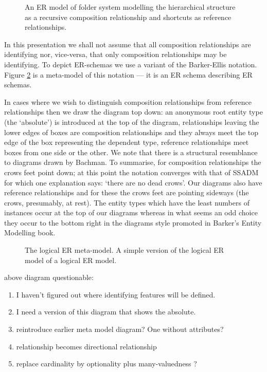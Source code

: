 \begin{figure}[H]
\begin{center}

\end{center}
\caption{An ER model of folder system modelling the hierarchical structure as a recursive composition relationship and shortcuts as reference relationships.}
\label{filesystem2FirstInstance}
\end{figure}

In this presentation we shall not assume that all composition relationships are identifying nor, vice-versa, that only composition relationships may be identifying. To depict ER-schemas we use a variant of the Barker-Ellis notation. 
Figure \ref{entityRelationalMetaModel1} is a meta-model of this notation — it is an ER schema describing ER schemas.

In cases where we wish to distinguish composition relationships from reference relationships then we draw the diagram top down: an anonymous root entity type (the ‘absolute’) is introduced at the top of the diagram, relationships leaving the lower edges of boxes are composition relationships and they always meet the top edge of the box representing the dependent type, reference relationships meet boxes from one side or the other. We note that there is a structural resemblance to diagrams drawn by Bachman. To summarise, for composition relationships the crows feet point down; at this point the notation converges with that of SSADM for which one explanation says: ‘there are no dead crows’. Our diagrams also have reference relationships and for these the crows feet are pointing sideways (the crows, presumably, at rest). The entity types which have the least numbers of instances occur at the top of our diagrams whereas in what seems an odd choice they occur to the bottom right in the diagrams style promoted in Barker's Entity Modelling book.

\begin{figure}[H]
\begin{center}

\end{center}
\caption{The logical ER meta-model. A simple version of the logical ER model of a logical ER model.}
\label{entityRelationalMetaModel1}
\end{figure}

\begin{noteforfuture}
above diagram questionable:
\begin{enumerate}
\item I haven't figured out where identifying features will be defined.
\item I need a version of this diagram that shows the absolute.
\item reintroduce earlier meta model diagram? One without attributes?
\item relationship becomes directional relationship
\item replace cardinality by optionality plus many-valuedness ?
\end{enumerate}
\end{noteforfuture}






